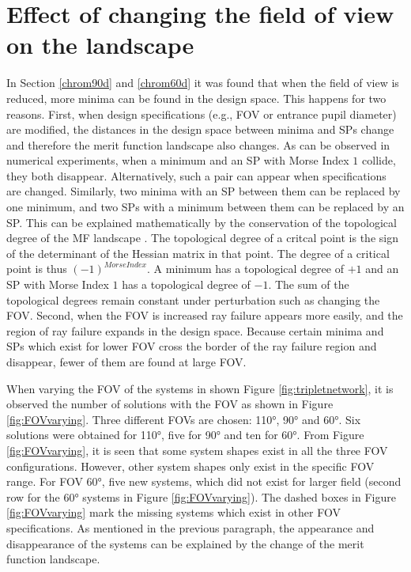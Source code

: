 \section{Effect of changing the field of view on the landscape}
In Section \ref{chrom90d} and \ref{chrom60d} it was found that when the field of view is reduced, more minima can be found in the design space. This happens for two reasons. First, when design specifications (e.g., FOV or entrance pupil diameter) are modified, the distances in the design space between minima and SPs change
and therefore the merit function landscape also changes. As can be observed in numerical experiments, when a minimum and an SP with Morse Index $1$ collide, they both disappear. Alternatively, such a pair can appear when specifications are changed. Similarly, two minima with an SP between them can be replaced by one minimum, and two SPs with a minimum between them can be replaced by an SP. This can be explained mathematically by the conservation of the topological degree of the MF landscape \cite{vanTurnhoutThesis2009} \cite{KoornwinderTopologicaldegree}. The topological degree of a critcal point is the sign of the determinant of the Hessian matrix in that point. The degree of a critical point is thus $(-1)^{Morse Index}$. A minimum has a topological degree of $+1$ and an SP with Morse Index $1$ has a topological degree of $-1$. The sum of the topological degrees remain constant under perturbation such as changing the FOV. Second, when the FOV is increased ray failure appears more easily, and the region of ray failure expands in the design space. Because certain minima and SPs which exist for lower FOV cross the border of the ray failure region and disappear, fewer of them are found at large FOV.

 When varying the FOV of the systems in shown Figure \ref{fig:tripletnetwork}, it is observed the number of solutions with the FOV as shown in Figure \ref{fig:FOVvarying}. Three different FOVs are chosen: 110°, 90° and 60°. Six solutions were obtained for 110°, five for 90° and ten for 60°. From Figure \ref{fig:FOVvarying}, it is seen that some system shapes exist in all the three FOV configurations. However, other system shapes only exist in the specific FOV range.
For FOV 60°, five new systems, which did not exist for larger field (second row for the 60° systems in Figure \ref{fig:FOVvarying}). The dashed boxes in Figure \ref{fig:FOVvarying} mark the missing systems which exist in other FOV specifications. As mentioned in the previous paragraph, the appearance and disappearance of the systems can be explained by the change of the merit function landscape. 

